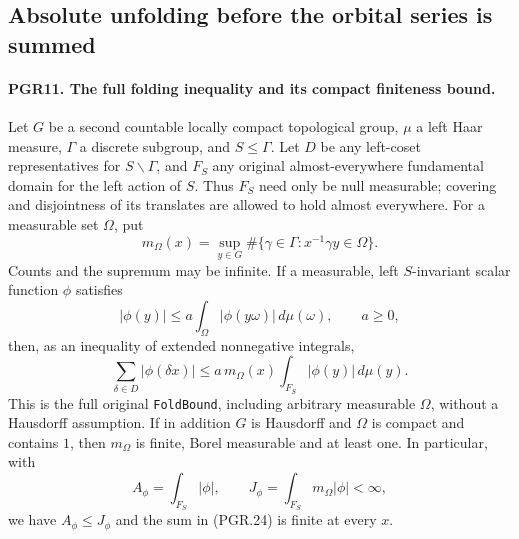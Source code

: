 \documentclass[11pt,a4paper]{article}
\numberwithin{equation}{section}
\theoremstyle{remark}\newtheorem{remark}[theorem]{Remark}
\begin{document}
\subsection{Absolute unfolding before the orbital series is summed}

\paragraph{PGR11. The full folding inequality and its compact finiteness bound.}
\label{claim:PGR11}
Let \(G\) be a second countable locally compact topological group,
\(\mu\) a left Haar measure, \(\Gamma\) a discrete subgroup,
and \(S\leq\Gamma\).  Let \(D\) be any left-coset
representatives for \(S\backslash\Gamma\), and \(F_S\) any
original almost-everywhere fundamental domain for the left action
of \(S\).  Thus \(F_S\) need only be null measurable; covering
and disjointness of its translates are allowed to hold almost everywhere.
For a measurable set \(\Omega\), put
\[
 m_\Omega(x)=\sup_{y\in G}
       \#\{\gamma\in\Gamma:x^{-1}\gamma y\in\Omega\}.
\tag{PGR.22}
\]
Counts and the supremum may be infinite.  If a measurable,
left \(S\)-invariant scalar function \(\phi\) satisfies
\[
 |\phi(y)|\leq a\int_\Omega|\phi(y\omega)|\,d\mu(\omega),
 \qquad a\geq0,
\tag{PGR.23}
\]
then, as an inequality of extended nonnegative integrals,
\[
 \sum_{\delta\in D}|\phi(\delta x)|
       \leq a\,m_\Omega(x)\int_{F_S}|\phi(y)|\,d\mu(y).
\tag{PGR.24}
\]
This is the full original \texttt{Fold\allowbreak Bound}, including arbitrary
measurable \(\Omega\), without a Hausdorff assumption.
If in addition \(G\) is Hausdorff and \(\Omega\) is compact
and contains \(1\), then \(m_\Omega\) is finite, Borel measurable and at
least one.  In particular, with
\[
 A_\phi=\int_{F_S}|\phi|,\qquad
 J_\phi=\int_{F_S}m_\Omega|\phi|<\infty,
\tag{PGR.25}
\]
we have \(A_\phi\leq J_\phi\) and the sum in (PGR.24)
is finite at every \(x\).
\end{document}
